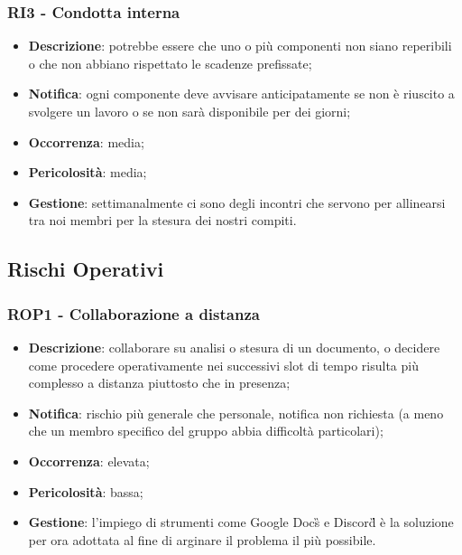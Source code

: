 	\subsubsection*{RI3 - Condotta interna}
	\begin{itemize}
		\item \textbf{Descrizione}: potrebbe essere che uno o più componenti non siano reperibili o che non abbiano rispettato le scadenze prefissate;
		\item \textbf{Notifica}: ogni componente deve avvisare anticipatamente se non è riuscito a svolgere un lavoro o se non sarà disponibile per dei giorni;
		\item \textbf{Occorrenza}: media;
		\item \textbf{Pericolosità}: media;
		\item \textbf{Gestione}: settimanalmente ci sono degli incontri che servono per allinearsi tra noi membri per la stesura dei nostri compiti.
	\end{itemize}

   \subsection{Rischi Operativi}
  
  	\subsubsection*{ROP1 - Collaborazione a distanza}
  	\begin{itemize}
  		\item \textbf{Descrizione}: collaborare su analisi o stesura di un documento, o decidere come procedere operativamente nei successivi slot di tempo risulta più complesso a distanza piuttosto che in presenza;
  		\item \textbf{Notifica}: rischio più generale che personale, notifica non richiesta (a meno che un membro specifico del gruppo abbia difficoltà particolari);
  		\item \textbf{Occorrenza}: elevata;
  		\item \textbf{Pericolosità}: bassa;
  		\item \textbf{Gestione}: l'impiego di strumenti come Google Docs\G{} e Discord\G{} è la soluzione per ora adottata al fine di arginare il problema il più possibile.
  	\end{itemize}